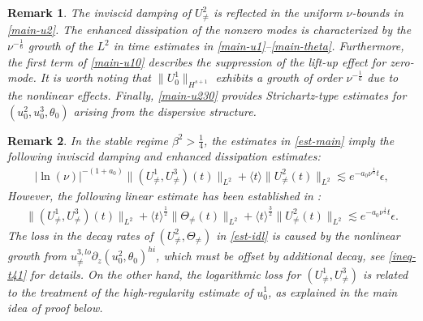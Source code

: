 \documentclass[12pt]{article}
\newtheorem{remark}{Remark}[section]
\numberwithin{equation}{section}
\begin{document}
	\begin{remark}
		The inviscid damping of $U^2_{\neq}$ is reflected in the uniform $\nu$-bounds in \eqref{main-u2}. 
		The	enhanced dissipation of the nonzero modes is characterized by the $\nu^{-\frac{1}{6}}$ growth of the $L^2$ in time estimates in \eqref{main-u1}--\eqref{main-theta}. Furthermore, the first term of \eqref{main-u10} describes the suppression of the lift-up effect for zero-mode. It is worth noting that  $\|U^1_0\|_{H^{s+1}}$ exhibits a growth of order $\nu^{-\frac{1}{6}}$ due to the nonlinear effects. Finally, \eqref{main-u230} provides Strichartz-type estimates for $(u^2_0,u^3_0,\theta_0)$ arising from the dispersive structure.
	\end{remark}
	\begin{remark}
		In the stable regime $\beta^2>\frac{1}{4}$, the estimates in \eqref{est-main} imply the following inviscid damping and enhanced dissipation estimates:
		\begin{align}\label{est-idl}
			|\ln(\nu)|^{-(1+a_0)}\|(U^1_{\neq},U^3_{\neq})(t)\|_{L^2}+\langle t\rangle \|U^2_{\neq}(t)\|_{L^2}\lesssim e^{-a_0\nu^{\frac{1}{3}}t}\epsilon,
		\end{align}
		However, the following linear estimate has been established in \cite{CD23} :
		\begin{align}\label{est-id}
			\|(U^1_{\neq},U^3_{\neq})(t)\|_{L^2}+\langle t\rangle^{\frac{1}{2}}\|\Theta_{\neq}(t)\|_{L^2}+\langle t\rangle^{\frac{3}{2}} \|U^2_{\neq}(t)\|_{L^2}\lesssim e^{-a_0\nu^{\frac{1}{3}}t}\epsilon.
		\end{align} 
		The loss in the decay rates of $(U^2_{\neq},\Theta_{\neq})$ in \eqref{est-idl} is caused by the nonlinear growth from $u^{3,lo}_{\neq}\partial_z(u^{2}_0,\theta_0)^{hi}$, which must be offset by additional decay, see \eqref{ineq-t41} for details. On the other hand, the logarithmic loss for $(U^1_{\neq},U^3_{\neq})$ is related to the treatment of the high-regularity estimate of $u^1_0$, as explained in the main idea of proof below.
				

\end{remark}
\end{document}
